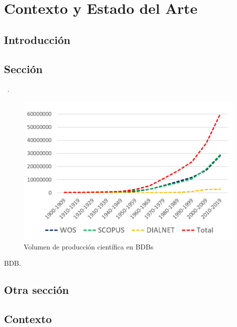 \chapter{Contexto y Estado del Arte}\label{ch:estadodelarte}

\section{Introducción}\label{sec:intro_estadodelarte}
\lipsum[1]

\section{Sección}\label{sec:produccion_estadodelarte}
\lipsum[1]~\cite{Becerra15,Castellanos14}.

\begin{figure}[h]
    \centering
    \includegraphics[width=\textwidth]{Figure/Imagen1}
    \caption{Volumen de producción científica en \ac{BDB}s}
    \label{fig:Imagen1}
\end{figure}

\lipsum[1]\ac{BDB}.

\section{Otra sección}\label{sec:bases_estadodelarte}
\lipsum[1-4]

\section{Contexto}\label{sec:contexto_estadodelarte}
\lipsum[2-3]

